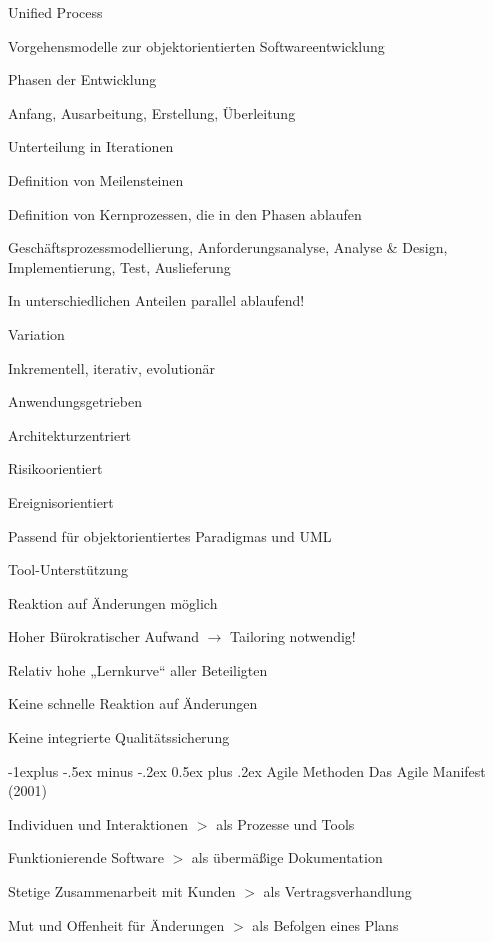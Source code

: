 \documentclass[a4paper]{article}
\makeatletter
\renewcommand{\subsection}{\@startsection{subsection}{2}{0mm}%
                                {-1explus -.5ex minus -.2ex}%
                                {0.5ex plus .2ex}%
                                {\normalfont\normalsize\bfseries}}
\makeatother
\begin{document}
\begin{multicols}{3}
  Unified Process
  \begin{itemize*}
    \item Vorgehensmodelle zur objektorientierten Softwareentwicklung
    \item Phasen der Entwicklung
    \begin{itemize*}
      \item Anfang, Ausarbeitung, Erstellung, Überleitung
      \item Unterteilung in Iterationen
      \item Definition von Meilensteinen
    \end{itemize*}
    \item Definition von Kernprozessen, die in den Phasen ablaufen
    \begin{itemize*}
      \item Geschäftsprozessmodellierung, Anforderungsanalyse, Analyse \& Design, Implementierung, Test, Auslieferung
      \item In unterschiedlichen Anteilen parallel ablaufend!
    \end{itemize*}
    \item Variation
    \begin{itemize*}
      \item Inkrementell, iterativ, evolutionär
      \item Anwendungsgetrieben
      \item Architekturzentriert
      \item Risikoorientiert
      \item Ereignisorientiert
    \end{itemize*}
    \item Passend für objektorientiertes Paradigmas und UML
    \item Tool-Unterstützung
    \item Reaktion auf Änderungen möglich
    \item Hoher Bürokratischer Aufwand $\rightarrow$ Tailoring notwendig!
    \item Relativ hohe „Lernkurve“ aller Beteiligten
    \item Keine schnelle Reaktion auf Änderungen
    \item Keine integrierte Qualitätssicherung
  \end{itemize*}

  \subsection{Agile Methoden}
  Das Agile Manifest (2001)
  \begin{itemize*}
    \item Individuen und Interaktionen $>$ als Prozesse und Tools
    \item Funktionierende Software $>$ als übermäßige Dokumentation
    \item Stetige Zusammenarbeit mit Kunden $>$ als Vertragsverhandlung
    \item Mut und Offenheit für Änderungen $>$ als Befolgen eines Plans
  \end{itemize*}


\end{multicols}
\end{document}
